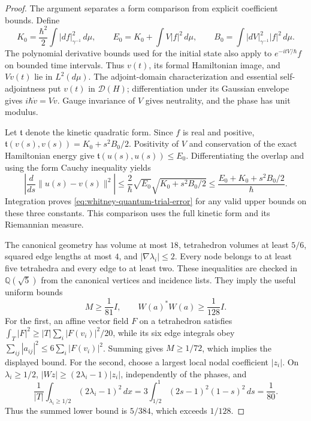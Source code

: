 \begin{proof}
The argument separates a form comparison from explicit coefficient bounds.
Define
\[
 K_0=\frac{\hbar^2}{2}\int|df|_{\gamma^{-1}}^2\,d\mu,
 \qquad E_0=K_0+\int V|f|^2\,d\mu,
 \qquad B_0=\int|dV|_{\gamma^{-1}}^2|f|^2\,d\mu.
\]
The polynomial derivative bounds used for the initial state also apply to
\(e^{-itV/\hbar}f\) on bounded time intervals. Thus \(v(t)\), its
formal Hamiltonian image, and \(Vv(t)\) lie in \(L^2(d\mu)\).
The adjoint-domain characterization and essential self-adjointness put
\(v(t)\) in \(\mathcal D(H)\); differentiation under its Gaussian
envelope gives \(i\hbar\dot v=Vv\). Gauge invariance of \(V\) gives
neutrality, and the phase has unit modulus.

Let \(\mathfrak t\) denote the kinetic quadratic form. Since \(f\) is
real and positive,
\(\mathfrak t(v(s),v(s))=K_0+s^2B_0/2\). Positivity of \(V\)
and conservation of the exact Hamiltonian energy give
\(\mathfrak t(u(s),u(s))\leq E_0\). Differentiating the overlap and
using the form Cauchy inequality yields
\[
 \left|\frac{d}{ds}\|u(s)-v(s)\|^2\right|
 \leq\frac{2}{\hbar}\sqrt{E_0}\sqrt{K_0+s^2B_0/2}
 \leq\frac{E_0+K_0+s^2B_0/2}{\hbar}.
\]
Integration proves \eqref{eq:whitney-quantum-trial-error} for any valid
upper bounds on these three constants. This comparison uses the full
kinetic form and its Riemannian measure.

The canonical geometry has volume at most \(18\), tetrahedron volumes
at least \(5/6\), squared edge lengths at most \(4\), and
\(|\nabla\lambda_i|\leq2\). Every node belongs to at least five
tetrahedra and every edge to at least two. These inequalities are checked
in \(\mathbb Q(\sqrt5)\) from the canonical vertices and incidence lists.
They imply the useful uniform bounds
\begin{equation}
 M\geq\frac1{81}I,\qquad W(a)^*W(a)\geq\frac1{128}I.
 \label{eq:whitney-quantum-history-coercivity}
\end{equation}
For the first, an affine vector field \(F\) on a tetrahedron satisfies
\(\int_T|F|^2\geq |T|\sum_i|F(v_i)|^2/20\), while its six edge
integrals obey \(\sum_{ij}|a_{ij}|^2\leq6\sum_i|F(v_i)|^2\).
Summing gives \(M\geq1/72\), which implies the displayed bound.
For the second, choose a largest local nodal coefficient \(|z_i|\).
On \(\lambda_i\geq1/2\),
\(|Wz|\geq(2\lambda_i-1)|z_i|\), independently of the phases, and
\[
 \frac1{|T|}\int_{\lambda_i\geq1/2}(2\lambda_i-1)^2\,dx
 =3\int_{1/2}^1(2s-1)^2(1-s)^2\,ds=\frac1{80}.
\]
Thus the summed lower bound is \(5/384\), which exceeds \(1/128\).


\end{proof}
